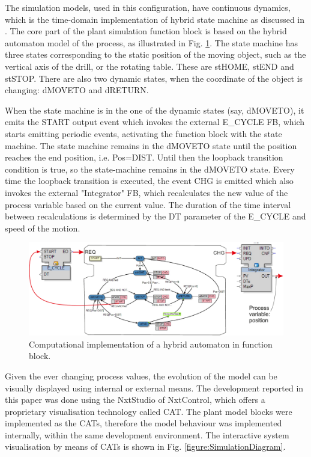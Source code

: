 \begin{bibunit}
The simulation models, used in this configuration, have continuous dynamics, which is the time-domain implementation of hybrid state machine as discussed in \cite{vyatkin2008closed}. 
The core part of the plant simulation function block is based on the hybrid automaton model of the process, as illustrated in Fig. \ref{figure:Hybrid}.
The state machine has three states corresponding to the static position of the moving object, such as the vertical axis of the drill, or the rotating table. These are {stHOME}, {stEND} and {stSTOP}. There are also two dynamic states, when the coordinate of the object is changing: {dMOVETO} and {dRETURN}. 

When the state machine is in the one of the dynamic states (say, {dMOVETO}), it emits the START output event which invokes the external {E\_CYCLE} FB, which starts emitting periodic events, activating the function block with the state machine. 
The state machine remains in the {dMOVETO} state until the position reaches the end position, i.e. Pos=DIST. Until then the loopback transition condition is true, so the state-machine remains in the {dMOVETO} state. Every time the loopback transition is executed, the event CHG is emitted which also invokes the external "Integrator" FB, which recalculates the new value of the process variable based on the current value. The duration of the time interval between recalculations is determined by the {DT} parameter of the {E\_CYCLE} and speed of the motion. 

\begin{figure}
    \centering
    \includegraphics[scale = 0.36]{MX_Papers/Paper2/images/hybrid.pdf}
    \caption{Computational implementation of a hybrid automaton in function block.}
    \label{figure:Hybrid}
\end{figure}

Given the ever changing process values, the evolution of the model can be visually displayed using internal or external means. The development reported in this paper was done using the NxtStudio of NxtControl, which offers a proprietary visualisation technology called {CAT}. The plant model blocks were implemented as the {CATs}, therefore the model behaviour was implemented internally, within the same development environment. The interactive system visualisation by means of CATs is shown in Fig. \ref{figure:SimulationDiagram}.


\end{bibunit}
